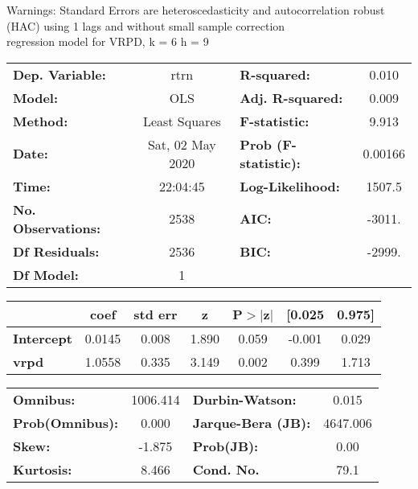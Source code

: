 Warnings: \newline
 [1] Standard Errors are heteroscedasticity and autocorrelation robust (HAC) using 1 lags and without small sample correction\\ 

regression model for VRPD, k = 6 h = 9\begin{center}
\begin{tabular}{lclc}
\toprule
\textbf{Dep. Variable:}    &       rtrn       & \textbf{  R-squared:         } &     0.010   \\
\textbf{Model:}            &       OLS        & \textbf{  Adj. R-squared:    } &     0.009   \\
\textbf{Method:}           &  Least Squares   & \textbf{  F-statistic:       } &     9.913   \\
\textbf{Date:}             & Sat, 02 May 2020 & \textbf{  Prob (F-statistic):} &  0.00166    \\
\textbf{Time:}             &     22:04:45     & \textbf{  Log-Likelihood:    } &    1507.5   \\
\textbf{No. Observations:} &        2538      & \textbf{  AIC:               } &    -3011.   \\
\textbf{Df Residuals:}     &        2536      & \textbf{  BIC:               } &    -2999.   \\
\textbf{Df Model:}         &           1      & \textbf{                     } &             \\
\bottomrule
\end{tabular}
\begin{tabular}{lcccccc}
                   & \textbf{coef} & \textbf{std err} & \textbf{z} & \textbf{P$> |$z$|$} & \textbf{[0.025} & \textbf{0.975]}  \\
\midrule
\textbf{Intercept} &       0.0145  &        0.008     &     1.890  &         0.059        &       -0.001    &        0.029     \\
\textbf{vrpd}      &       1.0558  &        0.335     &     3.149  &         0.002        &        0.399    &        1.713     \\
\bottomrule
\end{tabular}
\begin{tabular}{lclc}
\textbf{Omnibus:}       & 1006.414 & \textbf{  Durbin-Watson:     } &    0.015  \\
\textbf{Prob(Omnibus):} &   0.000  & \textbf{  Jarque-Bera (JB):  } & 4647.006  \\
\textbf{Skew:}          &  -1.875  & \textbf{  Prob(JB):          } &     0.00  \\
\textbf{Kurtosis:}      &   8.466  & \textbf{  Cond. No.          } &     79.1  \\
\bottomrule
\end{tabular}
\end{center}

